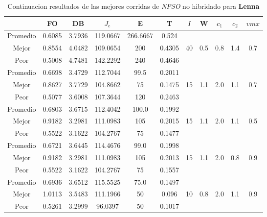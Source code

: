 \begin{table}[h!]
    \footnotesize
    \begin{center}
        \begin{tabular}{|c|c|c|c|c|c|c|c|c|c|c|}
        \hline
            & {\bf FO} & {\bf DB} & $J_e$ & {\bf E} & {\bf T} & $I$ & W & $c_1$ & $c_2$ & $vmx$ \\
        \hline
        \hline
            Promedio  & 0.6085 & 3.7936 & 119.0667 & 266.6667 & 0.524 &  &  &  &  & \\
            \cline{1-6}
            Mejor & 0.8554 & 4.0482  & 109.0654 & 200 & 0.4305 & 40 & 0.5 & 0.8 & 1.4 & 0.7\\
            \cline{1-6}
            Peor & 0.5008 & 4.7481  & 142.2292 & 240 & 0.4646 &  &  &  &  & \\
        \hline
        \hline
            Promedio  & 0.6698 & 3.4729 & 112.7044 & 99.5 & 0.2011 &  &  &  &  & \\
            \cline{1-6}
            Mejor & 0.8627 & 3.7729  & 104.8662 & 75 & 0.1475 & 15 & 1.1 & 2.0 & 1.1 & 0.7\\
            \cline{1-6}
            Peor & 0.5077 & 3.6008  & 107.3644 & 120 & 0.2463 &  &  &  &  & \\
        \hline
        \hline
            Promedio  & 0.6803 & 3.6715 & 112.4042 & 100.0 & 0.1992 &  &  &  &  & \\
            \cline{1-6}
            Mejor & 0.9182 & 3.2981  & 111.0983 & 105 & 0.2015 & 15 & 1.1 & 2.0 & 1.1 & 0.5\\
            \cline{1-6}
            Peor & 0.5522 & 3.1622  & 104.2767 & 75 & 0.1477 &  &  &  &  & \\
        \hline
        \hline
            Promedio  & 0.6721 & 3.6445 & 114.4676 & 99.0 & 0.1998 &  &  &  &  & \\
            \cline{1-6}
            Mejor & 0.9182 & 3.2981  & 111.0983 & 105 & 0.2013 & 15 & 1.1 & 2.0 & 0.8 & 0.9\\
            \cline{1-6}
            Peor & 0.5522 & 3.1622  & 104.2767 & 75 & 0.1557 &  &  &  &  & \\
        \hline
        \hline
            Promedio  & 0.6936 & 3.6512 & 115.5525 & 75.0 & 0.1497 &  &  &  &  & \\
            \cline{1-6}
            Mejor & 1.0113 & 3.5483  & 111.1966 & 50 & 0.096 & 10 & 0.8 & 2.0 & 1.1 & 0.9\\
            \cline{1-6}
            Peor & 0.5261 & 3.2999  & 96.0397 & 50 & 0.1017 &  &  &  &  & \\
        \hline
        \end{tabular}
        \caption{Continuacion resultados de las mejores corridas de \emph{NPSO} no hibridado para {\bf Lenna}}
        \label{tb:tablepsoalgimgc}
    \end{center}
\end{table}
